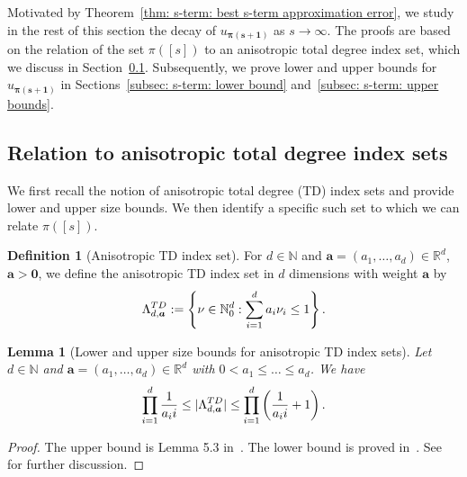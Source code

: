 \documentclass[namedate,webpdf]{ima-authoring-template-blank}
\newcommand{\absd}[1]{|#1|}    %
\newcounter{counter}
\numberwithin{counter}{section}
\numberwithin{equation}{section}
\theoremstyle{plain}
\newtheorem{lemma}[counter]{Lemma}
\theoremstyle{definition}
\newtheorem{definition}[counter]{Definition}
\newcommand*{\bbN}{\mathbb{N}}
\newcommand*{\bbR}{\mathbb{R}}
\theoremstyle{thmstyletwo}
\begin{document}
Motivated by Theorem~\ref{thm: s-term: best s-term approximation error}, we study in the rest of this section the decay of \(u_{\bm{\pi(s + 1)}}\) as \(s \to \infty\).
The proofs are based on the relation of the set \(\pi([s])\) to an anisotropic total degree index set, which we discuss in Section~\ref{subsec: s-term: relation to anisotropic total degree index sets}. Subsequently, we prove lower and upper bounds for \(u_{\bm{\pi(s + 1)}}\) in Sections~\ref{subsec: s-term: lower bound} and~\ref{subsec: s-term: upper bounds}.



\subsection{Relation to anisotropic total degree index sets}
\label{subsec: s-term: relation to anisotropic total degree index sets}

We first recall the notion of anisotropic total degree (TD) index sets and provide lower and upper size bounds. We then identify a specific such set to which we can relate \(\pi([s])\).

\begin{definition}[Anisotropic TD index set]
    For \(d\in\bbN\) and \(\bm{a}=(a_1,\dots,a_d)\in\bbR^d\), \(\bm{a} > \bm{0}\), we define the anisotropic TD index set in \(d\) dimensions with weight \(\bm{a}\) by
    \[
    \Lambda_{d,\bm{a}}^{\textup{TD}} := \left\{\nu\in\bbN_0^d : \sum_{i=1}^d a_i \nu_i \leq 1\right\}.
    \]
\end{definition}

\begin{lemma}[Lower and upper size bounds for anisotropic TD index sets]
\label{lem: size bounds}
    Let \(d \in \bbN\) and \(\bm{a}=(a_1,\dots,a_d)\in\bbR^d\) with \(0 < a_1\leq\dots\leq a_d\). We have
    \begin{equation}
    \label{eq: anisotropic TD index set}
               \prod_{i=1}^d \frac{1}{a_i i} \leq \absd{\Lambda_{d,\bm{a}}^{\textup{TD}}} \leq \prod_{i=1}^d \left(\frac{1}{a_i i} + 1\right).
    \end{equation}
\end{lemma}

\begin{proof}
    The upper bound is Lemma 5.3 in~\citet{haji-ali_NovelResultsAnisotropicSparse_2018}. The lower bound is proved in~\citet{beged-dov_LowerUpperBoundsNumber_1972}. See~\citet{griebel_TensorProductApproximationAnalytic_2016} for further discussion.
\end{proof}
\end{document}
